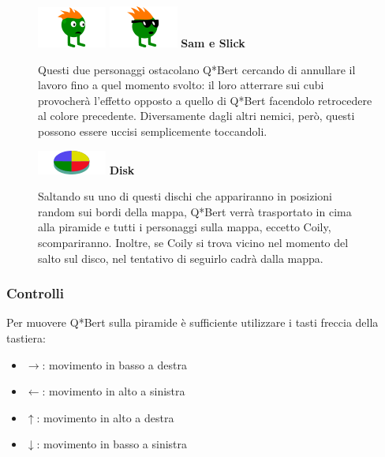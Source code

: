 \documentclass[a4paper,12pt, hidelinks]{report}
\begin{document}
\begin{figure}[H]
		\item
		\includegraphics[width=0.15\linewidth]{img/Sam}
		\includegraphics[width=0.15\linewidth]{img/Slick}
		\label{img:Sam&Slick}
		\textbf{Sam e Slick}

		Questi due personaggi ostacolano Q*Bert cercando di annullare il lavoro fino a quel momento svolto: il loro atterrare sui cubi provocherà l'effetto opposto a quello di Q*Bert facendolo retrocedere al colore precedente. Diversamente dagli altri nemici, però, questi possono essere uccisi semplicemente toccandoli.

\end{figure}

\begin{figure}[H]
		\item
		\includegraphics[width=0.15\linewidth]{img/Disk}
		\label{img:Disk}
		\textbf{Disk}

		Saltando su uno di questi dischi che appariranno in posizioni random sui bordi della mappa, Q*Bert verrà trasportato in cima alla piramide e tutti i personaggi sulla mappa, eccetto Coily, scompariranno. Inoltre, se Coily si trova vicino nel momento del salto sul disco, nel tentativo di seguirlo cadrà dalla mappa.

\end{figure}

\subsubsection{Controlli}

Per muovere Q*Bert sulla piramide è sufficiente utilizzare i tasti freccia della tastiera:

\begin{itemize}
	\item \textbf{$\rightarrow$}: movimento in basso a destra
	\item \textbf{$\leftarrow$}: movimento in alto a sinistra
	\item \textbf{$\uparrow$}: movimento in alto a destra
	\item \textbf{$\downarrow$}: movimento in basso a sinistra
\end{itemize}
\end{document}
